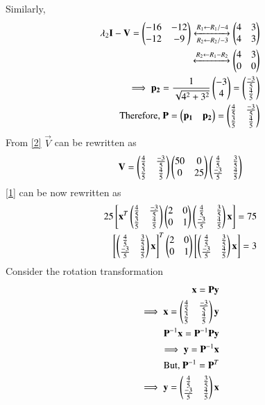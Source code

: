 \documentclass[journal,12pt,twocolumn]{IEEEtran}
\begin{document}
Similarly,
\begin{align}
  \lambda_2\mathbf{I}-\mathbf{V}= \begin{pmatrix}-16&-12\\-12&-9\end{pmatrix}\xleftrightarrow[R_2\leftarrow R_2/-3]{R_1\leftarrow R_1/-4}\begin{pmatrix}4&3\\4&3\end{pmatrix}\\
\xleftrightarrow[]{R_2\leftarrow R_1-R_2}\begin{pmatrix}4&3\\0&0\end{pmatrix}\\
\implies \mathbf{p_2}=\frac{1}{\sqrt{4^2+3^2}}\begin{pmatrix}-3\\4\end{pmatrix}=\begin{pmatrix}\frac{-3}{5}\\\frac{4}{5}\end{pmatrix}\\\text{ Therefore, } \mathbf{P}=\begin{pmatrix}\mathbf{p_1}&\mathbf{p_2}\end{pmatrix}=\begin{pmatrix}\frac{4}{5}&\frac{-3}{5}\\ \frac{3}{5}&\frac{4}{5}\end{pmatrix}
\end{align}
From \eqref{2} $\vec{V}$ can be rewritten as
\begin{align}
    \mathbf{V}=\begin{pmatrix}\frac{4}{5}&\frac{-3}{5}\\ \frac{3}{5}&\frac{4}{5}\end{pmatrix}\begin{pmatrix}50&0\\0&25\end{pmatrix}\begin{pmatrix}\frac{4}{5}&\frac{3}{5}\\ \frac{-3}{5}&\frac{4}{5}\end{pmatrix}
\end{align}
\eqref{1} can be now rewritten as
\begin{align}
25\left[\mathbf{x}^T\begin{pmatrix}\frac{4}{5}&\frac{-3}{5}\\ \frac{3}{5}&\frac{4}{5}\end{pmatrix}\begin{pmatrix}2&0\\0&1\end{pmatrix}\begin{pmatrix}\frac{4}{5}&\frac{3}{5}\\ \frac{-3}{5}&\frac{4}{5}\end{pmatrix}\mathbf{x}\right]=75\\
  \left[\begin{pmatrix}\frac{4}{5}&\frac{3}{5}\\ \frac{-3}{5}&\frac{4}{5}\end{pmatrix}\mathbf{x}\right]^T\begin{pmatrix}2&0\\0&1\end{pmatrix}\left[\begin{pmatrix}\frac{4}{5}&\frac{3}{5}\\ \frac{-3}{5}&\frac{4}{5}\end{pmatrix}\mathbf{x}\right]= 3\label{3}
\end{align}
 Consider the rotation transformation 
\begin{align}
  \mathbf{x}=\mathbf{P}\mathbf{y}\\
  \implies \mathbf{x}=\begin{pmatrix}\frac{4}{5}&\frac{-3}{5}\\ \frac{3}{5}&\frac{4}{5}\end{pmatrix}\mathbf{y}\label{4}\\
  \mathbf{P}^{-1}\mathbf{x}=\mathbf{P}^{-1}\mathbf{P}\mathbf{y}\\
  \implies \mathbf{y}= \mathbf{P}^{-1}\mathbf{x}\\
  \text{But, }\mathbf{P}^{-1}=\mathbf{P}^T\\
  \implies \mathbf{y}=\begin{pmatrix}\frac{4}{5}&\frac{3}{5}\\ \frac{-3}{5}&\frac{4}{5}\end{pmatrix}\mathbf{x}
\end{align}
\end{document}
